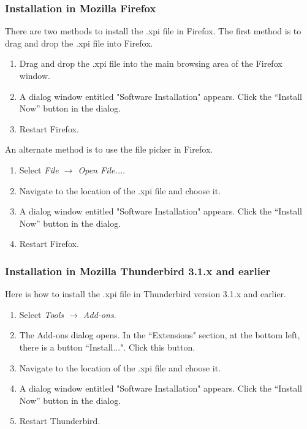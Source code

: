 \subsubsection{Installation in Mozilla Firefox}
There are two methods to install the .xpi file in Firefox. The first method is to drag and drop the .xpi file into Firefox.
\begin{enumerate}
  \item Drag and drop the .xpi file into the main browsing area of the Firefox window.
  \item A dialog window entitled "Software Installation" appears. Click the ``Install Now'' button in the dialog.
  \item Restart Firefox.
\end{enumerate}
An alternate method is to use the file picker in Firefox.
\begin{enumerate}
  \item Select \emph{File $\rightarrow$ Open File...}.
  \item Navigate to the location of the .xpi file and choose it.
  \item A dialog window entitled "Software Installation" appears. Click the ``Install Now'' button in the dialog.
  \item Restart Firefox.
\end{enumerate}

\subsubsection{Installation in Mozilla Thunderbird 3.1.x and earlier}
Here is how to install the .xpi file in Thunderbird version 3.1.x and earlier. 
\begin{enumerate}
  \item Select \emph{Tools $\rightarrow$ Add-ons}.
  \item The Add-ons dialog opens. In the ``Extensions" section, at the bottom left, there is a button ``Install...". Click this button.
  \item Navigate to the location of the .xpi file and choose it.
  \item A dialog window entitled "Software Installation" appears. Click the ``Install Now'' button in the dialog.
  \item Restart Thunderbird.
\end{enumerate}

